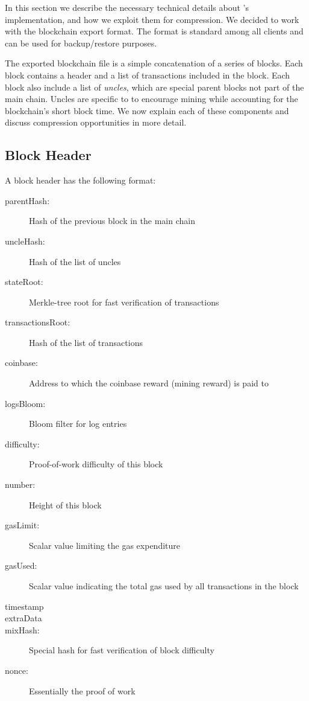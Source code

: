 In this section we describe the necessary technical details about \eth{}'s implementation, and how we exploit them for compression.
We decided to work with the \eth{} blockchain export format.
The format is standard among all \eth{} clients and can be used for backup/restore purposes.

The exported blockchain file is a simple concatenation of a series of blocks.
Each block contains a header and a list of transactions included in the block.
Each \eth{} block also include a list of {\em uncles}, which are special parent blocks not part of the main chain.
Uncles are specific to \eth{} to encourage mining while accounting for the blockchain's short block time.
We now explain each of these components and discuss compression opportunities in more detail.


\subsection{Block Header}
A block header has the following format:
\begin{description}
 \item[parentHash:] Hash of the previous block in the main chain
 \item[uncleHash:] Hash of the list of uncles
 \item[stateRoot:] Merkle-tree root for fast verification of transactions
 \item[transactionsRoot:] Hash of the list of transactions
 \item[coinbase:] Address to which the coinbase reward (mining reward) is paid to
 \item[logsBloom:] Bloom filter for log entries
 \item[difficulty:] Proof-of-work difficulty of this block
 \item[number:] Height of this block
 \item[gasLimit:] Scalar value limiting the gas expenditure
 \item[gasUsed:] Scalar value indicating the total gas used by all transactions in the block
 \item[timestamp]
 \item[extraData]
 \item[mixHash:] Special hash for fast verification of block difficulty
 \item[nonce:] Essentially the proof of work
\end{description}

